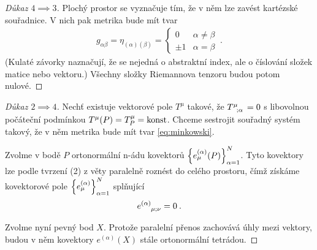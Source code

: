 \documentclass{article}
\begin{document}
\begin{proof}[Důkaz $4 \implies 3$]
    Plochý prostor se vyznačuje tím, že v něm lze zavést kartézské souřadnice. V nich pak metrika bude mít tvar
    \begin{align}
        g_{\alpha \beta } = \eta_{(\alpha)(\beta)} = \begin{cases} 0 & \alpha \neq \beta \\ \pm 1 & \alpha = \beta \end{cases} \:. \label{eq:minkowski}
    \end{align}
    (Kulaté závorky naznačují, že se nejedná o abstraktní index, ale o číslování složek matice nebo vektoru.)
    Všechny složky Riemannova tenzoru budou potom nulové.
\end{proof}
    
\begin{proof}[Důkaz $2 \implies 4$]
    Nechť existuje vektorové pole $T^\mu$ takové, že $T\indices{^\mu_;_\alpha} = 0$ s libovolnou počáteční podmínkou $T^\mu(P) = T_P^\mu = \mathrm{konst}$. Chceme sestrojit souřadný systém takový, že v něm metrika bude mít tvar \eqref{eq:minkowski}.

    Zvolme v bodě $P$ ortonormální n-ádu kovektorů $\left \lbrace e^{(\alpha)}_\mu(P) \right \rbrace_{\alpha = 1}^N$. Tyto kovektory lze podle tvrzení (2) z věty paralelně roznést do celého prostoru, čímž získáme kovektorové pole $\left \lbrace e^{(\alpha)}_\mu \right \rbrace_{\alpha = 1}^N$ splňující
    \begin{align}
        e\indices{^{(\alpha)}_\mu_;_\nu} = 0 \:.
    \end{align}

    Zvolme nyní pevný bod $X$. Protože paralelní přenos zachovává úhly mezi vektory, budou v něm kovektory $e^{(\alpha)}(X)$ stále ortonormální tetrádou.
    

\end{proof}
\end{document}
